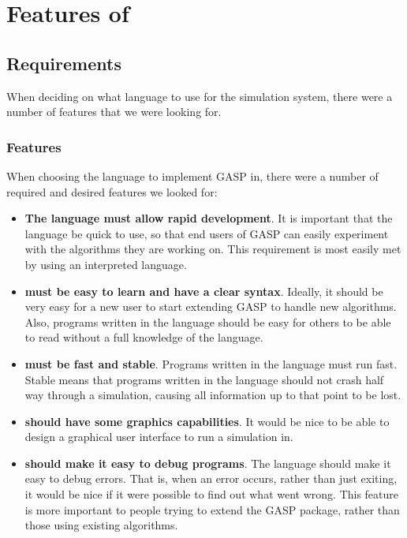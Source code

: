 \chapter{Features of \GAP}

\section{Requirements}

When deciding on what language to use for the simulation system, there
were a number of features that we were looking for.  

\subsection{Features}

When choosing the language to implement GASP in, there were a number
of required and desired features we looked for:

\begin{itemize}
\item \textbf{The language must allow rapid development}.  It is
important that the language be quick to use, so that end users of GASP
can easily experiment with the algorithms they are working on.  This
requirement is most easily met by using an interpreted language.
\item \textbf{must be easy to learn and have a clear syntax}.
Ideally, it should be very easy for a new user to start extending GASP
to handle new algorithms.  Also, programs written in the language
should be easy for others to be able to read without a full knowledge
of the language.
\item \textbf{must be fast and stable}.  Programs written in the language must
run fast.  Stable means that programs written in the language
should not crash half way through a simulation, causing all
information up to that point to be lost.
\item \textbf{should have some graphics capabilities}.  It
would be nice to be able to design a graphical user interface to run a
simulation in.
\item \textbf{should make it easy to debug programs}.  The language
should make it easy to debug errors.  That is, when an error occurs,
rather than just exiting, it would be nice if it were possible to find
out what went wrong.  This feature is more important to people trying
to extend the GASP package, rather than those using existing
algorithms.
\end{itemize}


